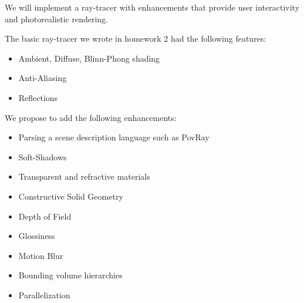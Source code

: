 \documentclass[12pt]{article}
\begin{document}
We will implement a ray-tracer with enhancements that provide user interactivity and photorealistic rendering.

The basic ray-tracer we wrote in homework 2 had the following features:
\begin{itemize}
    \item Ambient, Diffuse, Blinn-Phong shading

    \item Anti-Aliasing

    \item Reflections
\end{itemize}

We propose to add the following enhancements:
\begin{itemize}

    \item Parsing a scene description language such as PovRay

    \item Soft-Shadows

    \item Transparent and refractive materials

    \item Constructive Solid Geometry

    \item Depth of Field

    \item Glossiness

    \item Motion Blur

    \item Bounding volume hierarchies

    \item Parallelization

\end{itemize}
\end{document}
